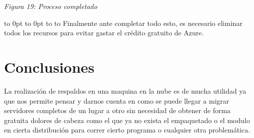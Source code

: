 \documentclass[10pt,executivepaper]{article}
\def\fillandplacepagenumber{%
 \par\pagestyle{empty}%
 \vbox to 0pt{\vss}\vfill
 \vbox to 0pt{\baselineskip0pt
   \hbox to\linewidth{\hss}%
   \baselineskip\footskip
   \hbox to\linewidth{%
     \hfil\thepage\hfil}\vss}}
\begin{document}
\begin{landscape}
\begin{center}
    \textit{Figura 19: Proceso completado}
  \end{center}
  \fillandplacepagenumber
  \clearpage
Finalmente ante completar todo esto, es necesario eliminar todos los recursos para evitar gastar el crédito gratuito de Azure.
\section{Conclusiones}
La realización de respaldos en una maquina en la nube es de mucha utilidad ya que nos permite pensar y darnos cuenta en como se puede llegar a migrar servidores completos de un lugar a otro sin necesidad de obtener de forma gratuita dolores de cabeza como el que ya no exista el empaquetado o el modulo en cierta distribución para correr cierto programa o cualquier otra problemática.

\end{landscape}
\end{document}
